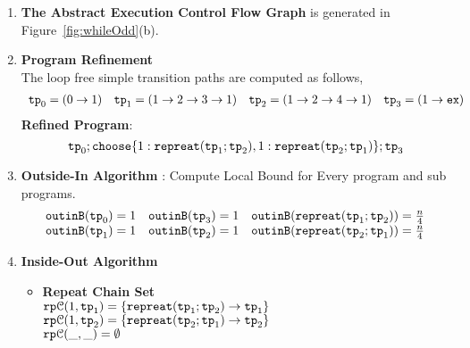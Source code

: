  \begin{enumerate}
    \item  \textbf{The Abstract Execution Control Flow Graph} is generated in Figure~\ref{fig:whileOdd}(b).
    \item \textbf{Program Refinement}
    \\
    The loop free simple transition paths are computed as follows,
    \[
    \begin{array}{llll}
      \mathtt{tp}_0 = (0 \to 1)
      &
      \mathtt{tp}_1 = (1 \to 2 \to 3 \to 1)
      &
      \mathtt{tp}_2 = (1 \to 2 \to 4 \to 1)
      &
      \mathtt{tp}_3 = (1 \to \mathtt{ex})
    \end{array}
    \]
  \textbf{Refined Program}:
  \[
    \tpath_0 ; \rpchoose{1: \rprepeat(\tpath_1; \tpath_2) , 
    1: \rprepeat(\tpath_2; \tpath_1)}; \tpath_3
    \]
  \item \textbf{Outside-In Algorithm} : Compute Local Bound for Every program and sub programs.
  \[
    \begin{array}{lll}
      \mathtt{outinB}(\mathtt{tp}_0) = 1
      &
      \mathtt{outinB}(\mathtt{tp}_3) = 1
      &
      \mathtt{outinB}(\mathtt{repreat}(\mathtt{tp}_1; \mathtt{tp}_2)) = \frac{n}{4} 
      \\
      \mathtt{outinB}(\mathtt{tp}_1) = 1 
      &
      \mathtt{outinB}(\mathtt{tp}_2) = 1 
      &
      \mathtt{outinB}(\mathtt{repreat}(\mathtt{tp}_2; \mathtt{tp}_1)) = \frac{n}{4}
    \end{array}
    \]
  \item \textbf{Inside-Out Algorithm}
  \begin{itemize}
    \item \textbf{Repeat Chain Set}
    \\
    $\mathtt{rp}\mathcal{C}(1, \mathtt{tp}_1) = \{ \mathtt{repreat}(\mathtt{tp}_1; \mathtt{tp}_2) \to \mathtt{tp}_1\}$ \\
    $\mathtt{rp}\mathcal{C}(1, \mathtt{tp}_2) = \{ \mathtt{repreat}(\mathtt{tp}_2; \mathtt{tp}_1) \to \mathtt{tp}_2\}$ \\
    $\mathtt{rp}\mathcal{C}(\_, \_) = \emptyset$ 

\end{itemize}
\end{enumerate}
